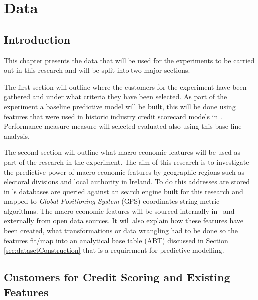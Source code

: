 
\chapter{Data} %

\label{Chapter3} %


\section{Introduction}
This chapter presents the data that will be used for the experiments to be carried out in this research and will be split into two major sections. 

The first section will outline where the customers for the experiment have been gathered and under what criteria they have been selected. As part of the experiment a baseline predictive model will be built, this will be done using features that were used in historic industry credit scorecard models in \subjectname. Performance measure measure will selected evaluated also using this base line analysis.

The second section will outline what macro-economic features will be used as part of the research in the experiment. The aim of this research is to investigate the predictive power of macro-economic features by geographic regions such as electoral divisions and local authority in Ireland. To do this addresses are stored in \subjectname's databases are queried against an search engine built for this research and mapped to \textit{Global Positioning System} (GPS) coordinates string metric algorithms. The macro-economic features will be sourced internally in \subjectname\ and externally from open data sources. It will also explain how these features have been created, what transformations or data wrangling had to be done so the features fit/map into an analytical base table (ABT) discussed in Section \ref{sec:datasetConstruction} that is a requirement for predictive modelling.

\section{Customers for Credit Scoring and Existing Features}

